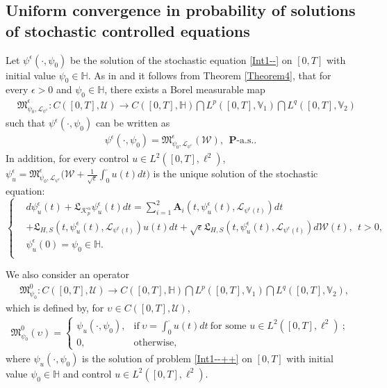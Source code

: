 \documentclass[11pt]{article}
\numberwithin{equation}{section}
\begin{document}
\subsection{Uniform convergence in probability of solutions of stochastic controlled equations}
Let  $\psi^\epsilon(\cdot,\psi_0)$ be the solution of
the  stochastic
equation  \eqref{Int1--}
on $[0,T]$ with initial value $\psi_0\in \mathbb{H}$.
As in \cite[Theorem 3.6]{LR4} and
\cite[Lemma 4.1]{Chenzhang4b}
it follows from Theorem \ref{Theorem4},
 that  for every $\epsilon>0$ and $\psi_0\in \mathbb{H}$, there exists a Borel measurable map \begin{align}&\label{WW2}
\mathfrak{M}_{\psi_0,\mathcal{L}_{\psi^\epsilon}}^\epsilon: C([0,T],\mathcal{U})\rightarrow C([0,T],\mathbb{H} )\bigcap L^p([0,T], \mathbb{V}_1  )\bigcap L^q([0,T], \mathbb{V}_2)
\end{align}
such that $\psi^\epsilon(\cdot,\psi_0)$ can be written as
\begin{align}\label{WW3}
\psi^\epsilon(\cdot,\psi_0)=
\mathfrak{M}_{\psi_0,\mathcal{L}_{\psi^\epsilon}}^\epsilon(\mathcal{W})
, \ \ \mbox{$\mathbf{P}$-a.s.}.
\end{align}
In addition, for every control $u\in L^2([0,T],\ell^2)$,
 $\psi^\epsilon_u=\mathfrak{M}_{\psi_0,\mathcal{L}_{\psi^\epsilon}}^\epsilon
\Big(\mathcal{W}+\frac{1}{\sqrt{\epsilon}}
\int_0^\cdot u(t)dt\Big)$ is the unique solution of the stochastic   equation:
\begin{equation}\label{Int1---}
\left\{
  \begin{aligned}
  &d \psi_u^\epsilon(t)+ \mathfrak{L}_{\mathcal{K}_{p}^\alpha} \psi_u^\epsilon(t) dt
=\sum_{i=1}^2\textbf{A}_i(t,\psi_u^\epsilon(t),
\mathcal{L}_{
\psi^\epsilon(t)})dt\\&+
\mathfrak{L}_{H,S}
(t,\psi_u^\epsilon(t),
\mathcal{L}_{
\psi^\epsilon(t)})u(t)dt+ \sqrt{\epsilon}\mathfrak{L}_{H,S}
(t,\psi_u^\epsilon(t),
\mathcal{L}_{
\psi^\epsilon(t)})d\mathcal{W}(t), \ \ t>0, \\
  &\psi_u^\epsilon(0)=\psi_0\in \mathbb{H}.\\
  \end{aligned}
\right.
\end{equation}

We also consider an operator
\begin{align}&\label{WW4}
\mathfrak{M}_{\psi_0}^0: C([0,T],\mathcal{U})\rightarrow C([0,T],\mathbb{H} )\bigcap L^p([0,T], \mathbb{V}_1  )\bigcap L^q([0,T], \mathbb{V}_2),
\end{align}
which is defined by, for $\upsilon\in C([0,T],\mathcal{U})$,
\begin{align}\label{WW5}
\mathfrak{M}_{\psi_0}^0(\upsilon)=\left\{
          \begin{array}{ll}
            \psi_u (\cdot, \psi_0), & \mbox{if}\ \upsilon=\int_0^\cdot u(t)dt\ \mbox{for some $u\in L^2([0,T],\ell^2)$}\ ;  \\
            0, & \mbox{otherwise},
          \end{array}
        \right.
        \end{align}
where $\psi_u(\cdot,\psi_0)$ is the solution of problem \eqref{Int1--++}
on $[0,T]$ with initial value $\psi_0\in \mathbb{H}$ and control $u\in L^2([0,T],\ell^2)$.
\end{document}
